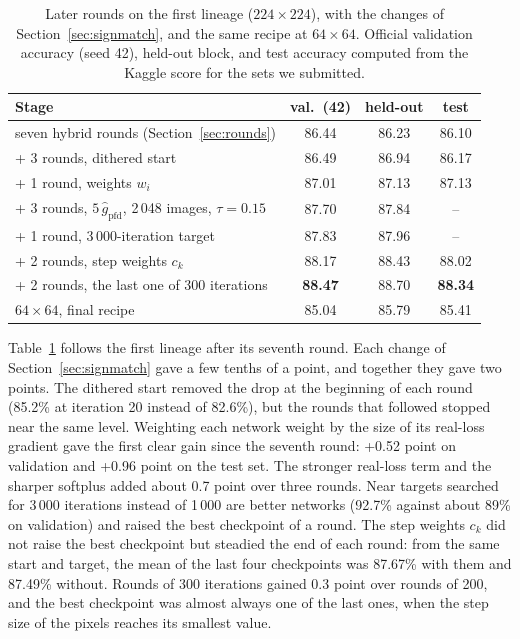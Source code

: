 \documentclass[journal]{IEEEtran}
\begin{document}
\begin{table}[t]
\centering
\caption{Later rounds on the first lineage ($224\times224$), with the changes of Section~\ref{sec:signmatch}, and
the same recipe at $64\times64$. Official validation accuracy (seed 42), held-out block, and test accuracy computed
from the Kaggle score for the sets we submitted.}
\label{tab:late}
\setlength{\tabcolsep}{3pt}
\begin{tabular}{lccc}
\toprule
Stage & val.\ (42) & held-out & test \\
\midrule
seven hybrid rounds (Section~\ref{sec:rounds}) & 86.44 & 86.23 & 86.10 \\
\quad + 3 rounds, dithered start & 86.49 & 86.94 & 86.17 \\
\quad + 1 round, weights $w_i$ & 87.01 & 87.13 & 87.13 \\
\quad + 3 rounds, $5\,\hat g_{\mathrm{pfd}}$, 2\,048 images, $\tau=0.15$ & 87.70 & 87.84 & -- \\
\quad + 1 round, 3\,000-iteration target & 87.83 & 87.96 & -- \\
\quad + 2 rounds, step weights $c_k$ & 88.17 & 88.43 & 88.02 \\
\quad + 2 rounds, the last one of 300 iterations & \textbf{88.47} & 88.70 & \textbf{88.34} \\
\midrule
$64\times64$, final recipe & 85.04 & 85.79 & 85.41 \\
\bottomrule
\end{tabular}
\end{table}

Table~\ref{tab:late} follows the first lineage after its seventh round. Each change of Section~\ref{sec:signmatch}
gave a few tenths of a point, and together they gave two points. The dithered start removed the drop at the
beginning of each round (85.2\% at iteration 20 instead of 82.6\%), but the rounds that followed stopped near the
same level. Weighting each network weight by the size of its real-loss gradient gave the first clear gain since the
seventh round: +0.52 point on validation and +0.96 point on the test set. The stronger real-loss term and the sharper
softplus added about 0.7 point over three rounds. Near targets searched for 3\,000 iterations instead of 1\,000 are
better networks (92.7\% against about 89\% on validation) and raised the best checkpoint of a round. The step weights
$c_k$ did not raise the best checkpoint but steadied the end of each round: from the same start and target, the mean
of the last four checkpoints was 87.67\% with them and 87.49\% without. Rounds of 300 iterations gained 0.3 point over
rounds of 200, and the best checkpoint was almost always one of the last ones, when the step size of the pixels
reaches its smallest value.
\end{document}
